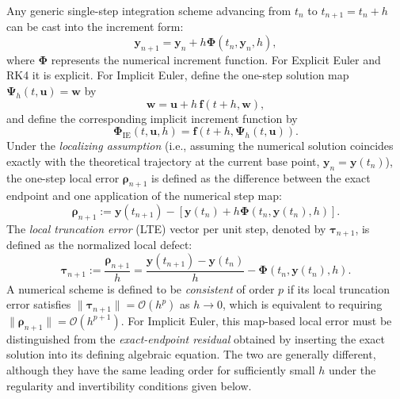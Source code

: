 Any generic single-step integration scheme advancing from $t_n$ to $t_{n+1}=t_n+h$ can be cast into the increment form:
\begin{equation}
\label{eq:general_increment_function}
\mathbf{y}_{n+1} = \mathbf{y}_n + h \mathbf{\Phi}(t_n, \mathbf{y}_n, h),
\end{equation}
where $\mathbf{\Phi}$ represents the numerical increment function. For Explicit Euler and RK4 it is explicit. For Implicit Euler, define the one-step solution map $\boldsymbol{\Psi}_h(t,\mathbf{u})=\mathbf{w}$ by
\begin{equation}
\label{eq:implicit_one_step_map}
\mathbf{w}=\mathbf{u}+h\,\mathbf{f}(t+h,\mathbf{w}),
\end{equation}
and define the corresponding implicit increment function by
\begin{equation}
\label{eq:implicit_increment_function}
\mathbf{\Phi}_{\mathrm{IE}}(t,\mathbf{u},h)=\mathbf{f}\left(t+h,\boldsymbol{\Psi}_h(t,\mathbf{u})\right).
\end{equation}
Under the \emph{localizing assumption} (i.e., assuming the numerical solution coincides exactly with the theoretical trajectory at the current base point, $\mathbf{y}_n = \mathbf{y}(t_n)$), the one-step local error $\boldsymbol{\rho}_{n+1}$ is defined as the difference between the exact endpoint and one application of the numerical step map:
\begin{equation}
\label{eq:local_defect_def}
\boldsymbol{\rho}_{n+1} := \mathbf{y}(t_{n+1}) - \left[ \mathbf{y}(t_n) + h \mathbf{\Phi}(t_n, \mathbf{y}(t_n), h) \right].
\end{equation}
The \emph{local truncation error} (LTE) vector per unit step, denoted by $\boldsymbol{\tau}_{n+1}$, is defined as the normalized local defect:
\begin{equation}
\label{eq:lte_def}
\boldsymbol{\tau}_{n+1} := \frac{\boldsymbol{\rho}_{n+1}}{h} = \frac{\mathbf{y}(t_{n+1}) - \mathbf{y}(t_n)}{h} - \mathbf{\Phi}(t_n, \mathbf{y}(t_n), h).
\end{equation}
A numerical scheme is defined to be \emph{consistent} of order $p$ if its local truncation error satisfies $\|\boldsymbol{\tau}_{n+1}\| = \mathcal{O}(h^p)$ as $h \to 0$, which is equivalent to requiring $\|\boldsymbol{\rho}_{n+1}\| = \mathcal{O}(h^{p+1})$.
For Implicit Euler, this map-based local error must be distinguished from the \emph{exact-endpoint residual} obtained by inserting the exact solution into its defining algebraic equation. The two are generally different, although they have the same leading order for sufficiently small $h$ under the regularity and invertibility conditions given below.

